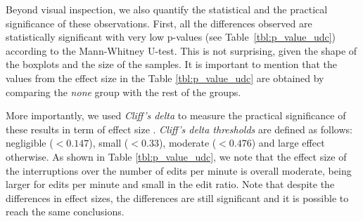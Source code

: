 Beyond visual inspection, we also quantify the statistical and the practical significance of these observations. First, all the differences observed are statistically significant with very low p-values (see Table~\ref{tbl:p_value_udc}) according to the Mann-Whitney U-test. This is not surprising, given the shape of the boxplots and the size of the samples. It is important to mention that the values from the effect size in the Table \ref{tbl:p_value_udc} are obtained by comparing the \textit{none} group with the rest of the groups.


More importantly, we used \textit{Cliff's delta} to measure the practical significance of these results in term of effect size %
\cite{C94}. \textit{Cliff's delta thresholds} are defined as follows: negligible ($<0.147$), small  ($<0.33$), moderate ($<0.476$) and large effect otherwise. As shown in Table \ref{tbl:p_value_udc}, we note that the effect size of the interruptions over the number of edits per minute is overall moderate, being larger for edits per minute and small in the edit ratio. Note that despite the differences in effect sizes, the differences are still significant and it is possible to reach the same conclusions.

